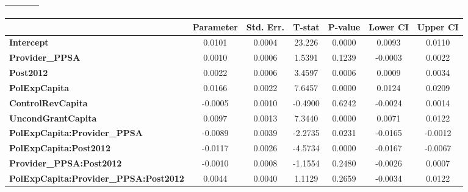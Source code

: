 \begin{center}
\begin{tabular}{lclc}
\textbf{}                                     &                    & \textbf{                     }   &                  \\
\bottomrule
\end{tabular}
\begin{tabular}{lcccccc}
                                              & \textbf{Parameter} & \textbf{Std. Err.} & \textbf{T-stat} & \textbf{P-value} & \textbf{Lower CI} & \textbf{Upper CI}  \\
\midrule
\textbf{Intercept}                            &       0.0101       &       0.0004       &      23.226     &      0.0000      &       0.0093      &       0.0110       \\
\textbf{Provider\_PPSA}                       &       0.0010       &       0.0006       &      1.5391     &      0.1239      &      -0.0003      &       0.0022       \\
\textbf{Post2012}                             &       0.0022       &       0.0006       &      3.4597     &      0.0006      &       0.0009      &       0.0034       \\
\textbf{PolExpCapita}                         &       0.0166       &       0.0022       &      7.6457     &      0.0000      &       0.0124      &       0.0209       \\
\textbf{ControlRevCapita}                     &      -0.0005       &       0.0010       &     -0.4900     &      0.6242      &      -0.0024      &       0.0014       \\
\textbf{UncondGrantCapita}                    &       0.0097       &       0.0013       &      7.3440     &      0.0000      &       0.0071      &       0.0122       \\
\textbf{PolExpCapita:Provider\_PPSA}          &      -0.0089       &       0.0039       &     -2.2735     &      0.0231      &      -0.0165      &      -0.0012       \\
\textbf{PolExpCapita:Post2012}                &      -0.0117       &       0.0026       &     -4.5734     &      0.0000      &      -0.0167      &      -0.0067       \\
\textbf{Provider\_PPSA:Post2012}              &      -0.0010       &       0.0008       &     -1.1554     &      0.2480      &      -0.0026      &       0.0007       \\
\textbf{PolExpCapita:Provider\_PPSA:Post2012} &       0.0044       &       0.0040       &      1.1129     &      0.2659      &      -0.0034      &       0.0122       \\
\bottomrule
\end{tabular}
\end{center}